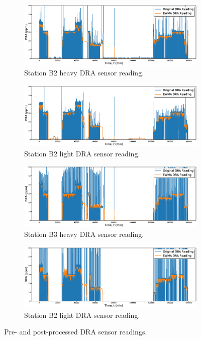 \begin{figure}
     \centering
     \begin{subfigure}[b]{0.9\textwidth}
         \centering
         \includegraphics[width=\textwidth]{images/suncor/08CIGSour.eps}
         \caption{Station B2 heavy DRA sensor reading.}
     \end{subfigure}
     \begin{subfigure}[b]{0.9\textwidth}
         \centering
         \includegraphics[width=\textwidth]{images/suncor/08CIGSweet.eps}
         \caption{Station B2 light DRA sensor reading.}
     \end{subfigure}
     \begin{subfigure}[b]{0.9\textwidth}
         \centering
         \includegraphics[width=\textwidth]{images/suncor/08AultSour.eps}
         \caption{Station B3 heavy DRA sensor reading.}
     \end{subfigure}
     \begin{subfigure}[b]{0.9\textwidth}
         \centering
         \includegraphics[width=\textwidth]{images/suncor/08AultSweet.eps}
         \caption{Station B2 light DRA sensor reading.}
     \end{subfigure}
        \caption{Pre- and post-processed DRA sensor readings.}
        \label{fig:02DRA}
\end{figure}


